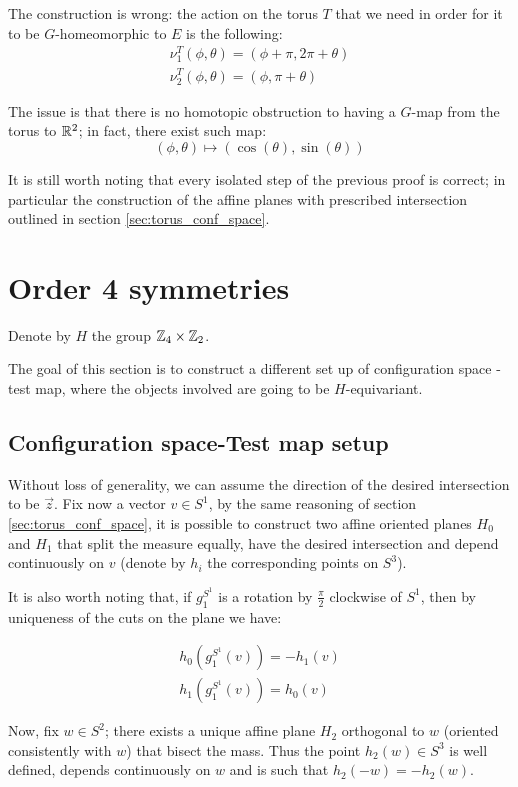 \documentclass[10pt]{article}
\begin{document}
The construction is wrong: the action on the torus $T$ that we need in order for it to be $G$-homeomorphic to $E$ is the following:
\begin{align*}
  \nu^T_1(\phi, \theta) = (\phi + \pi, 2\pi + \theta) \\
  \nu^T_2(\phi, \theta) = (\phi, \pi + \theta)
\end{align*}

The issue is that there is no homotopic obstruction to having a $G$-map from the torus to $\mathbb{R}^2$; in fact, there exist such map:
\[
  (\phi, \theta) \mapsto (\cos(\theta), \sin(\theta))
\]

It is still worth noting that every isolated step of the previous proof is correct; in particular the construction of the affine planes with prescribed intersection outlined in section \ref{sec:torus_conf_space}.


\section{Order 4 symmetries}
Denote by $H$ the group $\mathbb{Z}_4\times \mathbb{Z}_2$.

The goal of this section is to construct a different set up of configuration space - test map, where the
objects involved are going to be $H$-equivariant.

\subsection{Configuration space-Test map setup}

Without loss of generality, we can assume the direction of the desired intersection to be $\vec{z}$. Fix now
a vector $v\in S^1$, by the same reasoning of section \ref{sec:torus_conf_space}, it is possible to construct
two  affine oriented planes $H_0$ and $H_1$ that split the measure equally, have the desired intersection and
depend continuously on $v$ (denote by $h_i$ the corresponding points on $S^3$).

It is also worth noting that, if $g_1^{S^1}$ is a rotation by $\frac{\pi}{2}$ clockwise of $S^1$, then by uniqueness of the cuts on the plane we have:

\begin{align*}
  h_0(g_1^{S^1}(v)) = -h_1(v)\\
  h_1(g_1^{S^1}(v)) = h_0(v)
\end{align*}

Now, fix $w\in S^2$; there exists a unique affine plane $H_2$ orthogonal to $w$ (oriented consistently with $w$)
that bisect the mass. Thus the point $h_2(w)\in S^3$ is well defined, depends continuously on $w$ and is such that
$h_2(-w) = - h_2(w)$.
\end{document}

